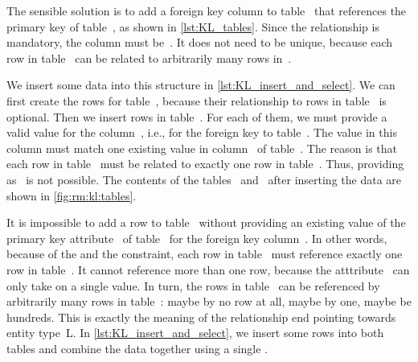 The sensible solution is to add a foreign key column to table~ that references the primary key of table~, as shown in \cref{lst:KL_tables}.
Since the relationship is mandatory, the column must be~.
It does not need to be unique, because each row in table~ can be related to arbitrarily many rows in~.

We insert some data into this structure in \cref{lst:KL_insert_and_select}.
We can first create the rows for table~, because their relationship to rows in table~ is optional.
Then we insert rows in table~.
For each of them, we must provide a valid value for the column~, i.e., for the foreign key to table~.
The value in this column must match one existing value in column~ of table~.
The reason is that each row in table~ must be related to exactly one row in table~.
Thus, providing~ as~ is not possible.
The contents of the tables~ and~ after inserting the data are shown in \cref{fig:rm:kl:tables}.

It is impossible to add a row to table~ without providing an existing value of the primary key attribute~ of table~ for the foreign key column~.
In other words, because of the  and the  constraint, each row in table~ must reference exactly one row in table~.
It cannot reference more than one row, because the atttribute~ can only take on a single value.
In turn, the rows in table~ can be referenced by arbitrarily many rows in table~:
maybe by no row at all, maybe by one, maybe be hundreds.
This is exactly the meaning of the  relationship end pointing towards entity type~L.
In \cref{lst:KL_insert_and_select}, we insert some rows into both tables and combine the data together using a single .%
%
\FloatBarrier%
\endhsection%
%
